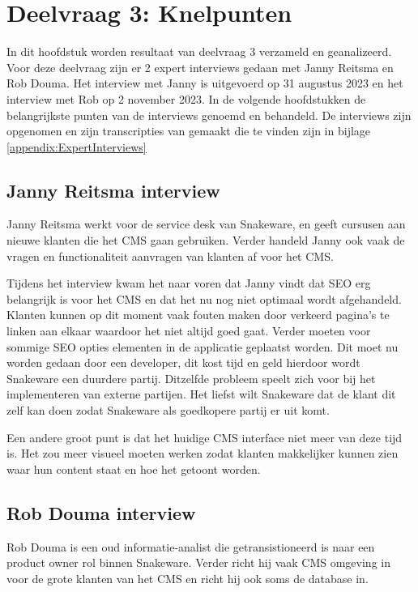 \section{Deelvraag 3: Knelpunten}
In dit hoofdstuk worden resultaat van deelvraag 3 \textit{\SubquestionThree} verzameld en geanalizeerd.
Voor deze deelvraag zijn er 2 expert interviews gedaan met Janny Reitsma en Rob Douma.
Het interview met Janny is uitgevoerd op 31 augustus 2023 en het interview met Rob op 2 november 2023.
In de volgende hoofdstukken de belangrijkste punten van de interviews genoemd en behandeld.
De interviews zijn opgenomen en zijn transcripties van gemaakt die te vinden zijn in bijlage \ref{appendix:ExpertInterviews}

\subsection{Janny Reitsma interview}
Janny Reitsma werkt voor de service desk van Snakeware, en geeft cursusen aan nieuwe klanten die het CMS gaan gebruiken.
Verder handeld Janny ook vaak de vragen en functionaliteit aanvragen van klanten af voor het CMS.

\whitespace
Tijdens het interview kwam het naar voren dat Janny vindt dat \gls{SEO} erg belangrijk is voor het CMS en dat het nu nog niet optimaal wordt afgehandeld.
Klanten kunnen op dit moment vaak fouten maken door verkeerd pagina's te linken aan elkaar waardoor het niet altijd goed gaat.
Verder moeten voor sommige \gls{SEO} opties elementen in de applicatie geplaatst worden.
Dit moet nu worden gedaan door een developer, dit kost tijd en geld hierdoor wordt Snakeware een duurdere partij.
Ditzelfde probleem speelt zich voor bij het implementeren van externe partijen.
Het liefst wilt Snakeware dat de klant dit zelf kan doen zodat Snakeware als goedkopere partij er uit komt.

\whitespace
Een andere groot punt is dat het huidige CMS interface niet meer van deze tijd is.
Het zou meer visueel moeten werken zodat klanten makkelijker kunnen zien waar hun content staat en hoe het getoont worden.

\subsection{Rob Douma interview}
Rob Douma is een oud informatie-analist die getransistioneerd is naar een product owner rol binnen Snakeware.
Verder richt hij vaak CMS omgeving in voor de grote klanten van het CMS en richt hij ook soms de database in.

